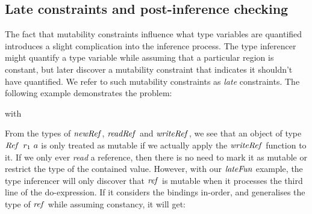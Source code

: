 \subsection{Late constraints and post-inference checking}
\label{Inference:Generalisation:late-constraints}

The fact that mutability constraints influence what type variables are quantified introduces a slight complication into the inference process. The type inferencer might quantify a type variable while assuming that a particular region is constant, but later discover a mutability constraint that indicates it shouldn't have quantified. We refer to such mutability constraints as \emph{late} constraints. The following example demonstrates the problem:

\bigskip
{}

with


From the types of $\operatorname{\mathit{newRef}}$, $\operatorname{\mathit{readRef}}$ and $\operatorname{\mathit{writeRef}}$, we see that an object of type $\operatorname{\mathit{Ref}} \ r_1 \ a$ is only treated as mutable if we actually apply the $\operatorname{\mathit{writeRef}}$ function to it. If we only ever \emph{read} a reference, then there is no need to mark it as mutable or restrict the type of the contained value. However, with our $\operatorname{\mathit{lateFun}}$ example, the type inferencer will only discover that $\operatorname{\mathit{ref}}$ is mutable when it processes the third line of the do-expression. If it considers the bindings in-order, and generalises the type of $\operatorname{\mathit{ref}}$ while assuming constancy, it will get:

